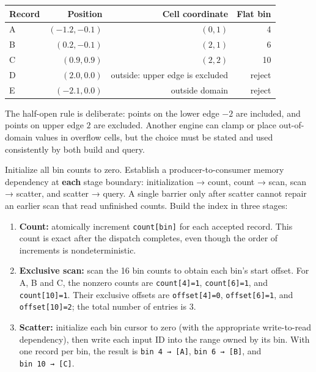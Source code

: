 {\def\LTcaptype{none} %
\begin{longtable}[]{@{}lrrr@{}}
\toprule\noalign{}
Record & Position & Cell coordinate & Flat bin \\
\midrule\noalign{}
\endhead
\bottomrule\noalign{}
\endlastfoot
A & \((-1.2,-0.1)\) & \((0,1)\) & 4 \\
B & \((0.2,-0.1)\) & \((2,1)\) & 6 \\
C & \((0.9,0.9)\) & \((2,2)\) & 10 \\
D & \((2.0,0.0)\) & outside: upper edge is excluded & reject \\
E & \((-2.1,0.0)\) & outside domain & reject \\
\end{longtable}
}

The half-open rule is deliberate: points on the lower edge \(-2\) are included, and points on upper edge \(2\) are excluded. Another engine can clamp or place out-of-domain values in overflow cells, but the choice must be stated and used consistently by both build and query.

Initialize all bin counts to zero. Establish a producer-to-consumer memory dependency at \textbf{each} stage boundary: initialization → count, count → scan, scan → scatter, and scatter → query. A single barrier only after scatter cannot repair an earlier scan that read unfinished counts. Build the index in three stages:

\begin{enumerate}
\def\labelenumi{\arabic{enumi}.}
\tightlist
\item
  \textbf{Count:} atomically increment \texttt{count{[}bin{]}} for each accepted record. This count is exact after the dispatch completes, even though the order of increments is nondeterministic.
\item
  \textbf{Exclusive scan:} scan the 16 bin counts to obtain each bin's start offset. For A, B and C, the nonzero counts are \texttt{count{[}4{]}=1}, \texttt{count{[}6{]}=1}, and \texttt{count{[}10{]}=1}. Their exclusive offsets are \texttt{offset{[}4{]}=0}, \texttt{offset{[}6{]}=1}, and \texttt{offset{[}10{]}=2}; the total number of entries is 3.
\item
  \textbf{Scatter:} initialize each bin cursor to zero (with the appropriate write-to-read dependency), then write each input ID into the range owned by its bin. With one record per bin, the result is \texttt{bin\ 4\ →\ {[}A{]}}, \texttt{bin\ 6\ →\ {[}B{]}}, and \texttt{bin\ 10\ →\ {[}C{]}}.
\end{enumerate}

